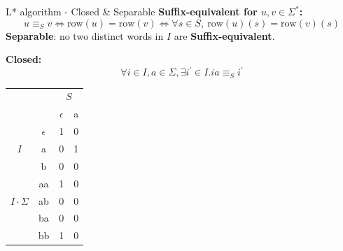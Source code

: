 \documentclass{beamer}
\begin{document}
\begin{frame}{L* algorithm - Closed \&  Separable}
    \textbf{Suffix-equivalent for $u, v \in \Sigma^{*}$: }
    $$
        u \equiv_{S} v
        \Leftrightarrow
        \text{row}(u) = \text{row}(v)
        \Leftrightarrow
        \forall s \in S,\ \text{row}(u)(s) = \text{row}(v)(s)
    $$
    \textbf{\small Separable}: \small no two distinct words in $I$ are \textbf{Suffix-equivalent}. 

    \textbf{Closed: }
    $$
        \forall i \in I , a \in \Sigma, \exists i^{\prime} \in I.ia \equiv_{S} i^{\prime}
    $$
    \centering
    \begin{tabular}{cc|c|c}
        &   & \multicolumn{2}{c}{$S$} \\ 
        \multicolumn{2}{c|}{} & $\epsilon$ & a \\ \hline
        & $\epsilon$ & 1 & 0 \\
        {$I$}& a          & 0 & 1 \\
        & b          & 0 & 0 \\ \hline
        
        & aa& 1& 0 \\
        {$I \cdot \Sigma$}& ab& 0&0\\
        & ba         & 0 & 0 \\
        & bb         & 1 & 0 \\  
    \end{tabular}
\end{frame}
\end{document}

